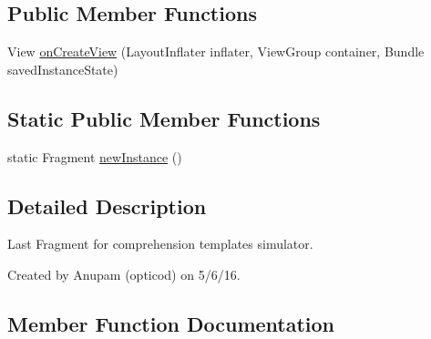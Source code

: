 \subsection*{Public Member Functions}
\begin{DoxyCompactItemize}
\item 
View \hyperlink{classorg_1_1buildmlearn_1_1toolkit_1_1comprehensiontemplate_1_1fragment_1_1LastFragment_a602049f64bc60408d0d145c382c7bb6d}{on\+Create\+View} (Layout\+Inflater inflater, View\+Group container, Bundle saved\+Instance\+State)
\end{DoxyCompactItemize}
\subsection*{Static Public Member Functions}
\begin{DoxyCompactItemize}
\item 
static Fragment \hyperlink{classorg_1_1buildmlearn_1_1toolkit_1_1comprehensiontemplate_1_1fragment_1_1LastFragment_aa5980f221bd002fc8744c371c6a1582e}{new\+Instance} ()
\end{DoxyCompactItemize}


\subsection{Detailed Description}
Last Fragment for comprehension template\textquotesingle{}s simulator. 

Created by Anupam (opticod) on 5/6/16. 

\subsection{Member Function Documentation}
